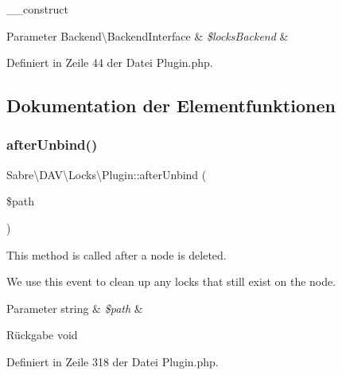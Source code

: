 \+\_\+\+\_\+construct


\begin{DoxyParams}[1]{Parameter}
Backend\textbackslash{}\+Backend\+Interface & {\em \$locks\+Backend} & \\
\hline
\end{DoxyParams}


Definiert in Zeile 44 der Datei Plugin.\+php.



\subsection{Dokumentation der Elementfunktionen}
\mbox{\label{class_sabre_1_1_d_a_v_1_1_locks_1_1_plugin_a67c30a24ab46aeb1c02f83305726bc1c}} 
\subsubsection{\texorpdfstring{after\+Unbind()}{afterUnbind()}}
{\footnotesize\ttfamily Sabre\textbackslash{}\+D\+A\+V\textbackslash{}\+Locks\textbackslash{}\+Plugin\+::after\+Unbind (\begin{DoxyParamCaption}\item[{}]{\$path }\end{DoxyParamCaption})}

This method is called after a node is deleted.

We use this event to clean up any locks that still exist on the node.


\begin{DoxyParams}[1]{Parameter}
string & {\em \$path} & \\
\hline
\end{DoxyParams}
\begin{DoxyReturn}{Rückgabe}
void 
\end{DoxyReturn}


Definiert in Zeile 318 der Datei Plugin.\+php.

\mbox{\label{class_sabre_1_1_d_a_v_1_1_locks_1_1_plugin_acf8e46a2928075324e4145e2b5f7c058}} 
